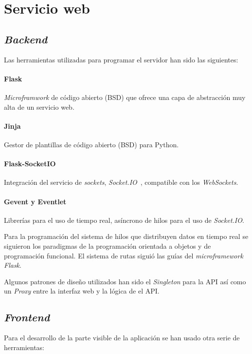 \section{Servicio web}

\subsection{\textit{Backend}}

Las herramientas utilizadas para programar el servidor han sido las siguientes:
\paragraph{Flask~\cite{tool:flask}}\textit{Microframwork} de código abierto (BSD) que ofrece una capa de abstracción muy alta de un servicio web.
\paragraph{Jinja~\cite{tool:jinja}}Gestor de plantillas de código abierto (BSD) para Python.
\paragraph{Flask-SocketIO~\cite{tool:flask-socketio}}Integración del servicio de \textit{sockets}, \textit{Socket.IO}~\cite{tool:socketio}, compatible con los \textit{WebSockets}.
\paragraph{Gevent y Eventlet~\cite{tool:eventlet, tool:gevent}}Librerías para el uso de tiempo real, asíncrono de hilos para el uso de \textit{Socket.IO}. 

Para la programación del sistema de hilos que distribuyen datos en tiempo real se siguieron los paradigmas de la programación orientada a objetos y de programación funcional. El sistema de rutas siguió las guías del \textit{microframework Flask}. 

Algunos patrones de diseño utilizados han sido el \textit{Singleton} para la API así como un \textit{Proxy} entre la interfaz web y la lógica de el API.

\subsection{\textit{Frontend}}

Para el desarrollo de la parte visible de la aplicación se han usado otra serie de herramientas:

